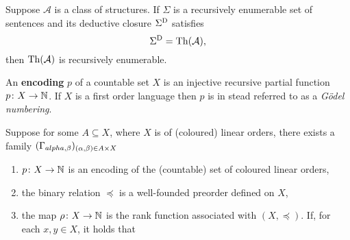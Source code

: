 \begin{prp}\label{prp:sdth}
	Suppose $\mathcal{A}$ is a class of structures.  If $\Sigma$ is a recursively enumerable set of sentences and its deductive closure ${\Sigma}^\mathrm{D}$ satisfies
	\begin{equation}
		{\Sigma}^\mathrm{D}=\operatorname{Th}(\mathcal{A}),
	\end{equation}
	then $\operatorname{Th}(\mathcal{A})$ is recursively enumerable.
\end{prp}

\begin{dfn}[Encoding]
	An \textbf{encoding} $p$ of a countable set $X$ is an injective recursive partial function $p\colon X\to\mathbb{N}$.  If $X$ is a first order language then $p$ is in stead referred to as a \textit{G\"odel numbering}.
\end{dfn}

\begin{dfn}[Frameworks]
	Suppose for some $A\subseteq X$, where $X$ is of (coloured) linear orders, there exists a family $(\Gamma_{alpha,\beta})_{(\alpha,\beta)\in A\times X}$
	\begin{enumerate}
		\item	$p\colon X\to\mathbb{N}$ is an encoding of the (countable) set of coloured linear orders,
		\item 	the binary relation $\preceq$ is a well-founded preorder defined on $X$,
		\item	the map $\rho\colon X\to\mathbb{N}$ is the rank function associated with $(X,\preceq)$.  If, for each $x,y\in X$, it holds that
	\end{enumerate}
\end{dfn}

